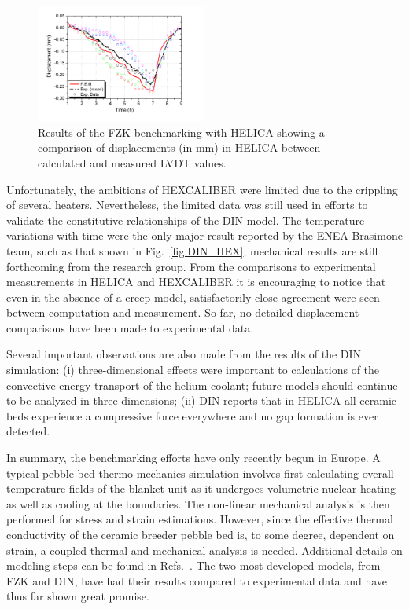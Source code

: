 \begin{figure}[t!]
\centering
\includegraphics[width=0.5\textwidth]{chapters/figures/Fig-7}
\caption{Results of the FZK benchmarking with HELICA\cite{Gan:2009vn} showing a comparison of displacements (in mm) in HELICA between calculated and measured LVDT values.}
\label{fig:FZK_HELICAb}
\end{figure}

Unfortunately, the ambitions of HEXCALIBER were limited due to the crippling of several heaters. Nevertheless, the limited data was still used in efforts to validate the constitutive relationships of the DIN model. The temperature variations with time were the only major result reported by the ENEA Brasimone team, such as that shown in Fig.~\ref{fig:DIN_HEX}; mechanical results are still forthcoming from the research group. From the comparisons to experimental measurements in HELICA and HEXCALIBER it is encouraging to notice that even in the absence of a creep model, satisfactorily close agreement were seen between computation and measurement. So far, no detailed displacement comparisons have been made to experimental data.

Several important observations are also made from the results of the DIN simulation: (i) three-dimensional effects were important to calculations of the convective energy transport of the helium coolant; future models should continue to be analyzed in three-dimensions; (ii) DIN reports that in HELICA all ceramic beds experience a compressive force everywhere and no gap formation is ever detected. 

In summary, the benchmarking efforts have only recently begun in Europe. A typical pebble bed thermo-mechanics simulation involves first calculating overall temperature fields of the blanket unit as it undergoes volumetric nuclear heating as well as cooling at the boundaries. The non-linear mechanical analysis is then performed for stress and strain estimations. However, since the effective thermal conductivity of the ceramic breeder pebble bed is, to some degree, dependent on strain, a coupled thermal and mechanical analysis is needed. Additional details on modeling steps can be found in Refs.~\cite{DellOrco:2010zr,DiMaio20081287,DiMaio20101234,Gan:2009vn,Gan:2010lh,dellorco:2006}. The two most developed models, from FZK and DIN, have had their results compared to experimental data and have thus far shown great promise. 

